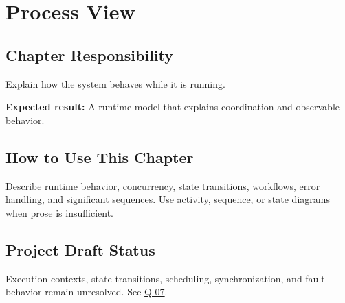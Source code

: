 \chapter{Process View}
\section{Chapter Responsibility}
\label{Section:ProcessViewResponsibility}
Explain how the system behaves while it is running.

\noindent\textbf{Expected result:} A runtime model that explains coordination and observable behavior.

\section{How to Use This Chapter}
Describe runtime behavior, concurrency, state transitions, workflows, error handling, and significant sequences. Use activity, sequence, or state diagrams when prose is insufficient.
\section{Project Draft Status}
Execution contexts, state transitions, scheduling, synchronization, and fault behavior remain unresolved. See \hyperref[Question:Q-07]{Q-07}.

